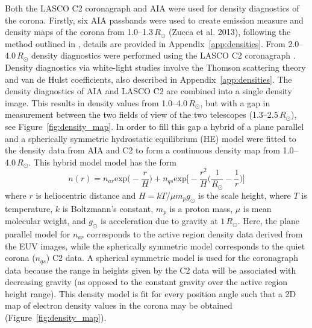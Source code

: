 Both the LASCO C2 coronagraph and AIA were used for density diagnostics of the corona. Firstly, six AIA passbands were used to create emission measure and density maps of the corona from 1.0--1.3\,$R_{\odot}$ (Zucca et al. 2013), following the method outlined in \citet{asch2013}, details are provided in Appendix~\ref{app:densities}. From 2.0--4.0\,$R_{\odot}$ density diagnostics were performed using the LASCO C2 coronagraph \citep{vdeh50}. Density diagnostics via white-light studies involve the Thomson scattering theory and van de Hulst coefficients, also described in Appendix~\ref{app:densities}. The density diagnostics of AIA and LASCO C2 are combined into a single density image. This results in density values from 1.0--4.0\,$R_{\odot}$, but with a gap in measurement between the two fields of view of the two telescopes (1.3--2.5\,$R_{\odot}$), see Figure~\ref{fig:density_map}. In order to fill this gap a hybrid of a plane parallel and a spherically symmetric hydrostatic equilibrium (HE) model were fitted to the density data from AIA and C2 to form a continuous density map from 1.0--4.0\,$R_{\odot}$. This hybrid model model has the form
\begin{equation}
n(r) = n_{ar}\mathrm{exp}\bigg(-\frac{r}{H}\bigg) + n_{qs}\mathrm{exp}\bigg[-\frac{r^2}{H} \bigg(\frac{1}{R_{\odot}}-\frac{1}{r}\bigg)\bigg]
\label{eqn:hybrid_hydro}
\end{equation}
where $r$ is heliocentric distance and $H=kT/\mu m_pg_{\odot}$ is the scale height, where $T$ is temperature, $k$ is Boltzmann's constant, $m_p$ is a proton mass, $\mu$ is mean molecular weight, and $g_{\odot}$ is acceleration due to gravity at $1\,R_{\odot}$. Here, the plane parallel model for $n_{ar}$ corresponds to the active region density data derived from the EUV images, while the spherically symmetric model corresponds to the quiet corona ($n_{qs}$) C2 data. A spherical symmetric model is used for the coronagraph data because the range in heights given by the C2 data will be associated with decreasing gravity (as opposed to the constant gravity over the active region height range). This density model is fit for every position angle such that a 2D map of electron density values in the corona may be obtained (Figure~\ref{fig:density_map}).

